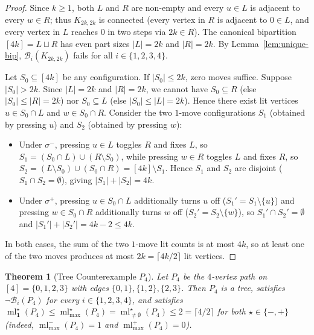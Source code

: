 \documentclass[11pt,a4paper]{article}
\newtheorem{theorem}{Theorem}[section]
\theoremstyle{definition}
\newcommand{\ml}{\operatorname{ml}}
\newcommand{\ceilhalf}[1]{\lceil #1 / 2 \rceil}
\begin{document}
\begin{proof}
Since $k \ge 1$, both $L$ and $R$ are non-empty and every $u \in L$ is adjacent to
every $w \in R$; thus $K_{2k,2k}$ is connected (every vertex in $R$ is adjacent to
$0 \in L$, and every vertex in $L$ reaches $0$ in two steps via $2k \in R$). The
canonical bipartition $[4k] = L \sqcup R$ has even part sizes $|L| = 2k$ and
$|R| = 2k$. By Lemma~\ref{lem:unique-bip}, $\mathcal{B}_i(K_{2k,2k})$ fails for
all $i \in \{1, 2, 3, 4\}$.

Let $S_0 \subseteq [4k]$ be any configuration. If $|S_0| \le 2k$, zero moves
suffice. Suppose $|S_0| > 2k$. Since $|L| = 2k$ and $|R| = 2k$, we cannot have
$S_0 \subseteq R$ (else $|S_0| \le |R| = 2k$) nor $S_0 \subseteq L$ (else
$|S_0| \le |L| = 2k$). Hence there exist lit vertices $u \in S_0 \cap L$ and
$w \in S_0 \cap R$. Consider the two $1$-move configurations $S_1$ (obtained by
pressing $u$) and $S_2$ (obtained by pressing $w$):
\begin{itemize}
\item Under $\sigma^-$, pressing $u \in L$ toggles $R$ and fixes $L$, so
$S_1 = (S_0 \cap L) \cup (R \setminus S_0)$, while pressing $w \in R$ toggles $L$
and fixes $R$, so $S_2 = (L \setminus S_0) \cup (S_0 \cap R) = [4k] \setminus S_1$.
Hence $S_1$ and $S_2$ are disjoint ($S_1 \cap S_2 = \emptyset$), giving
$|S_1| + |S_2| = 4k$.
\item Under $\sigma^+$, pressing $u \in S_0 \cap L$ additionally turns $u$ off
($S_1' = S_1 \setminus \{u\}$) and pressing $w \in S_0 \cap R$ additionally turns
$w$ off ($S_2' = S_2 \setminus \{w\}$), so $S_1' \cap S_2' = \emptyset$ and
$|S_1'| + |S_2'| = 4k - 2 \le 4k$.
\end{itemize}
In both cases, the sum of the two $1$-move lit counts is at most $4k$, so at least
one of the two moves produces at most $2k = \ceilhalf{4k}$ lit vertices.
\end{proof}

\begin{theorem}[Tree Counterexample $P_4$]
\label{thm:p4}
Let $P_4$ be the $4$-vertex path on $[4] = \{0, 1, 2, 3\}$ with edges
$\{0,1\}, \{1,2\}, \{2,3\}$. Then $P_4$ is a tree, satisfies $\neg \mathcal{B}_i(P_4)$
for every $i \in \{1, 2, 3, 4\}$, and satisfies
$\ml_{\mathbf{1}}^\star(P_4) \le \ml_{\max}^\star(P_4) = \ml_{\neq\emptyset}^\star(P_4) \le 2 = \ceilhalf{4}$
for both $\star \in \{-, +\}$ (indeed, $\ml_{\max}^-(P_4) = 1$ and $\ml_{\max}^+(P_4) = 0$).
\end{theorem}
\end{document}
